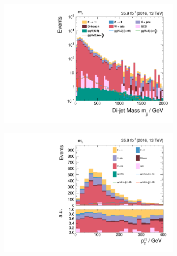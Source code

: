 \begin{figure}[h!]
    \begin{subfigure}{.45\textwidth}
        \centering
        \includegraphics[width=\textwidth]{Figures/eventselection/Categorization/et/mjj.pdf}
    \end{subfigure}%
    \begin{subfigure}{.45\textwidth}
        \centering
        \includegraphics[width=\textwidth]{Figures/eventselection/Categorization/et/H_pt.pdf}
    \end{subfigure} \\ %
    \begin{subfigure}{.45\textwidth}
        \centering

\end{subfigure}
\end{figure}

